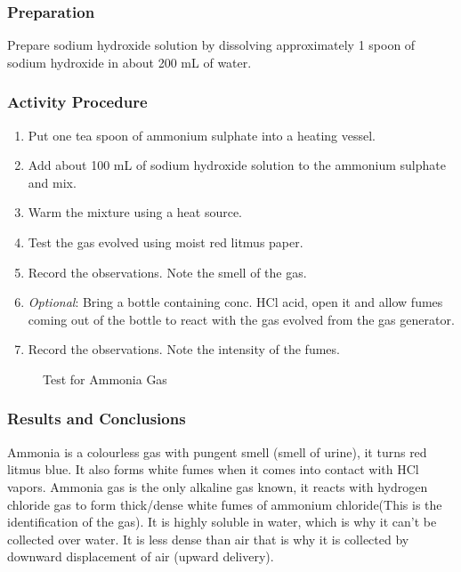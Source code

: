 \subsubsection*{Preparation}
Prepare sodium hydroxide solution by dissolving approximately 1 spoon of sodium hydroxide in about 200 mL of water.

\subsubsection*{Activity Procedure}
\begin{enumerate}
\item{Put one tea spoon of ammonium sulphate into a heating vessel.}
\item{Add about 100 mL of sodium hydroxide solution to the ammonium sulphate and mix.}
\item{Warm the mixture using a heat source.}
\item{Test the gas evolved using moist red litmus paper.}
\item{Record the observations. Note the smell of the gas.}
\item{\textit{Optional}: Bring a bottle containing conc. HCl acid, open it and allow fumes coming out of the bottle to react with the gas evolved from the gas generator.}
\item{Record the observations. Note the intensity of the fumes.}
\end{enumerate}


\begin{figure}[h]
\begin{center}
\def\svgwidth{200pt}

\caption{Test for Ammonia Gas}
\end{center}
\end{figure}

\subsubsection*{Results and Conclusions}
Ammonia is a colourless gas with pungent smell (smell of urine), it turns red litmus blue. It also forms white fumes when it comes into contact with HCl vapors.
Ammonia gas is the only alkaline gas known, it reacts with hydrogen chloride gas to form thick/dense white fumes of ammonium chloride(This is the identification of the gas). It is highly soluble in water, which is why it can't be collected over water. It is less dense than air that is why it is collected by downward displacement of air (upward delivery).

